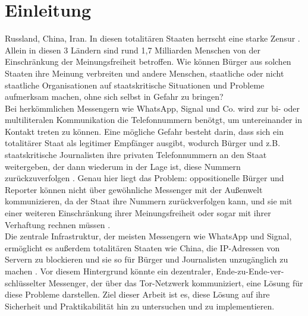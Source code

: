\documentclass[a4paper,ngerman, headheight=28pt,12pt]{scrartcl}
\newcommand{\vcite}[1]{\cite[vgl.][]{#1}}
\begin{document}

\pagestyle{empty}
\tableofcontents
\clearpage
\pagestyle{plain}
%
\setcounter{page}{1}

\linenumbers{}
\modulolinenumbers[5]
\section{Einleitung}
Russland, China, Iran. In diesen totalitären Staaten herrscht eine starke Zensur \vcite{AmnReport}. Allein in diesen 3 Ländern sind rund 1,7 Milliarden Menschen von der Einschränkung der Meinungsfreiheit betroffen.
Wie können Bürger aus solchen Staaten ihre Meinung verbreiten und andere Menschen, staatliche oder nicht staatliche Organisationen auf staatskritische Situationen und Probleme aufmerksam machen, ohne sich selbst in Gefahr zu bringen? \\
Bei herkömmlichen Messengern wie WhatsApp, Signal und Co. wird zur bi- oder multiliteralen Kommunikation die Telefonnummern benötgt, um untereinander in Kontakt treten zu können. Eine mögliche Gefahr besteht darin, dass sich ein totalitärer Staat als legitimer Empfänger ausgibt, wodurch Bürger und z.B. staatskritische Journalisten ihre privaten Telefonnummern an den Staat weitergeben, der dann wiederum in der Lage ist, diese Nummern zurückzuverfolgen \vcite{LocPolice}. Genau hier liegt das Problem: oppositionelle Bürger und Reporter können nicht über gewöhnliche Messenger mit der Außenwelt kommunizieren, da der Staat ihre Nummern zurückverfolgen kann, und sie mit einer weiteren Einschränkung ihrer Meinungsfreiheit oder sogar mit ihrer Verhaftung rechnen müssen \vcite{AmnReport}. \\
Die zentrale Infrastruktur, der meisten Messengern wie WhatsApp und Signal, ermöglicht es außerdem totalitären Staaten wie China, die IP-Adressen von Servern zu blockieren und sie so für Bürger und Journalisten unzugänglich zu machen \vcite{ChinaFirewall,CentralizedWhatsapp}.
Vor diesem Hintergrund könnte ein dezentraler, Ende-zu-Ende-ver-schlüsselter Messenger, der über das Tor-Netzwerk kommuniziert, eine Lösung für diese Probleme darstellen. Ziel dieser Arbeit ist es, diese Lösung auf ihre Sicherheit und Praktikabilität hin zu untersuchen und zu implementieren.\\
\end{document}
